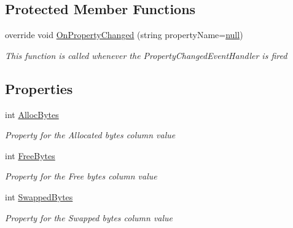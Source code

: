 \subsection*{Protected Member Functions}
\begin{DoxyCompactItemize}
\item 
override void \hyperlink{class_c_p_u___o_s___simulator_1_1_controls_1_1_graphs_1_1_view_models_1_1_memory_graph_model_a082e3a05bc7db863c211c8a47cb50959}{On\+Property\+Changed} (string property\+Name=\hyperlink{_old_01_process_01_flags_8cs_afb8e110345c45e74478894341ab6b28e}{null})
\begin{DoxyCompactList}\small\item\em This function is called whenever the Property\+Changed\+Event\+Handler is fired \end{DoxyCompactList}\end{DoxyCompactItemize}
\subsection*{Properties}
\begin{DoxyCompactItemize}
\item 
int \hyperlink{class_c_p_u___o_s___simulator_1_1_controls_1_1_graphs_1_1_view_models_1_1_memory_graph_model_a63bf6051fc50e150d259a4445f7ede44}{Alloc\+Bytes}
\begin{DoxyCompactList}\small\item\em Property for the Allocated bytes column value \end{DoxyCompactList}\item 
int \hyperlink{class_c_p_u___o_s___simulator_1_1_controls_1_1_graphs_1_1_view_models_1_1_memory_graph_model_adaaea51f4fa5a9338fee0764e9a3280c}{Free\+Bytes}
\begin{DoxyCompactList}\small\item\em Property for the Free bytes column value \end{DoxyCompactList}\item 
int \hyperlink{class_c_p_u___o_s___simulator_1_1_controls_1_1_graphs_1_1_view_models_1_1_memory_graph_model_a95a29e64f30ff3bda11978c95fae7243}{Swapped\+Bytes}
\begin{DoxyCompactList}\small\item\em Property for the Swapped bytes column value \end{DoxyCompactList}\end{DoxyCompactItemize}
